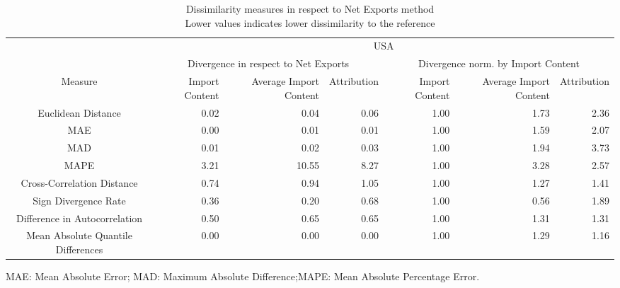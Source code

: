 \begin{table}[t]
\caption*{
{\large Dissimilarity measures in respect to Net Exports method} \\ 
{\small Lower values indicates lower dissimilarity to the reference}
} 
\fontsize{15.0pt}{18.0pt}\selectfont
\begin{tabular*}{\linewidth}{@{\extracolsep{\fill}}crrrrrr}
\toprule
 & \multicolumn{6}{c}{USA} \\ 
\cmidrule(lr){2-7}
 & \multicolumn{3}{c}{Divergence in respect to Net Exports} & \multicolumn{3}{c}{Divergence norm. by Import Content} \\ 
\cmidrule(lr){2-4} \cmidrule(lr){5-7}
Measure & Import Content & Average Import Content & Attribution & Import Content & Average Import Content & Attribution \\ 
\midrule\addlinespace[2.5pt]
Euclidean Distance & 0.02 & 0.04 & 0.06 & 1.00 & 1.73 & 2.36 \\ 
MAE & 0.00 & 0.01 & 0.01 & 1.00 & 1.59 & 2.07 \\ 
MAD & 0.01 & 0.02 & 0.03 & 1.00 & 1.94 & 3.73 \\ 
MAPE & 3.21 & 10.55 & 8.27 & 1.00 & 3.28 & 2.57 \\ 
Cross-Correlation Distance & 0.74 & 0.94 & 1.05 & 1.00 & 1.27 & 1.41 \\ 
Sign Divergence Rate & 0.36 & 0.20 & 0.68 & 1.00 & 0.56 & 1.89 \\ 
Difference in Autocorrelation & 0.50 & 0.65 & 0.65 & 1.00 & 1.31 & 1.31 \\ 
Mean Absolute Quantile Differences & 0.00 & 0.00 & 0.00 & 1.00 & 1.29 & 1.16 \\ 
\bottomrule
\end{tabular*}
\begin{minipage}{\linewidth}
MAE: Mean Absolute Error; MAD: Maximum Absolute Difference;MAPE: Mean Absolute Percentage Error.\\
\end{minipage}
\end{table}

